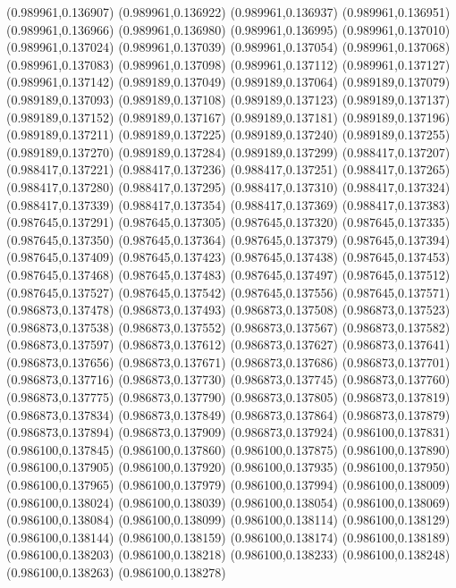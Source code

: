 (0.989961,0.136907)
(0.989961,0.136922)
(0.989961,0.136937)
(0.989961,0.136951)
(0.989961,0.136966)
(0.989961,0.136980)
(0.989961,0.136995)
(0.989961,0.137010)
(0.989961,0.137024)
(0.989961,0.137039)
(0.989961,0.137054)
(0.989961,0.137068)
(0.989961,0.137083)
(0.989961,0.137098)
(0.989961,0.137112)
(0.989961,0.137127)
(0.989961,0.137142)
(0.989189,0.137049)
(0.989189,0.137064)
(0.989189,0.137079)
(0.989189,0.137093)
(0.989189,0.137108)
(0.989189,0.137123)
(0.989189,0.137137)
(0.989189,0.137152)
(0.989189,0.137167)
(0.989189,0.137181)
(0.989189,0.137196)
(0.989189,0.137211)
(0.989189,0.137225)
(0.989189,0.137240)
(0.989189,0.137255)
(0.989189,0.137270)
(0.989189,0.137284)
(0.989189,0.137299)
(0.988417,0.137207)
(0.988417,0.137221)
(0.988417,0.137236)
(0.988417,0.137251)
(0.988417,0.137265)
(0.988417,0.137280)
(0.988417,0.137295)
(0.988417,0.137310)
(0.988417,0.137324)
(0.988417,0.137339)
(0.988417,0.137354)
(0.988417,0.137369)
(0.988417,0.137383)
(0.987645,0.137291)
(0.987645,0.137305)
(0.987645,0.137320)
(0.987645,0.137335)
(0.987645,0.137350)
(0.987645,0.137364)
(0.987645,0.137379)
(0.987645,0.137394)
(0.987645,0.137409)
(0.987645,0.137423)
(0.987645,0.137438)
(0.987645,0.137453)
(0.987645,0.137468)
(0.987645,0.137483)
(0.987645,0.137497)
(0.987645,0.137512)
(0.987645,0.137527)
(0.987645,0.137542)
(0.987645,0.137556)
(0.987645,0.137571)
(0.986873,0.137478)
(0.986873,0.137493)
(0.986873,0.137508)
(0.986873,0.137523)
(0.986873,0.137538)
(0.986873,0.137552)
(0.986873,0.137567)
(0.986873,0.137582)
(0.986873,0.137597)
(0.986873,0.137612)
(0.986873,0.137627)
(0.986873,0.137641)
(0.986873,0.137656)
(0.986873,0.137671)
(0.986873,0.137686)
(0.986873,0.137701)
(0.986873,0.137716)
(0.986873,0.137730)
(0.986873,0.137745)
(0.986873,0.137760)
(0.986873,0.137775)
(0.986873,0.137790)
(0.986873,0.137805)
(0.986873,0.137819)
(0.986873,0.137834)
(0.986873,0.137849)
(0.986873,0.137864)
(0.986873,0.137879)
(0.986873,0.137894)
(0.986873,0.137909)
(0.986873,0.137924)
(0.986100,0.137831)
(0.986100,0.137845)
(0.986100,0.137860)
(0.986100,0.137875)
(0.986100,0.137890)
(0.986100,0.137905)
(0.986100,0.137920)
(0.986100,0.137935)
(0.986100,0.137950)
(0.986100,0.137965)
(0.986100,0.137979)
(0.986100,0.137994)
(0.986100,0.138009)
(0.986100,0.138024)
(0.986100,0.138039)
(0.986100,0.138054)
(0.986100,0.138069)
(0.986100,0.138084)
(0.986100,0.138099)
(0.986100,0.138114)
(0.986100,0.138129)
(0.986100,0.138144)
(0.986100,0.138159)
(0.986100,0.138174)
(0.986100,0.138189)
(0.986100,0.138203)
(0.986100,0.138218)
(0.986100,0.138233)
(0.986100,0.138248)
(0.986100,0.138263)
(0.986100,0.138278)
